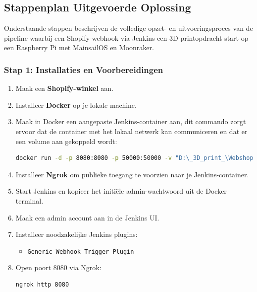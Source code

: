 \subsection{Stappenplan Uitgevoerde Oplossing}

Onderstaande stappen beschrijven de volledige opzet- en uitvoeringsproces van de pipeline waarbij een Shopify-webhook via Jenkins een 3D-printopdracht start op een Raspberry Pi met MainsailOS en Moonraker.

\subsubsection{Stap 1: Installaties en Voorbereidingen}
\begin{enumerate}
    \item Maak een \textbf{Shopify-winkel} aan.
    \item Installeer \textbf{Docker} op je lokale machine.
    \item Maak in Docker een aangepaste Jenkins-container aan, dit commando zorgt ervoor dat de container met het lokaal netwerk kan communiceren en dat er een volume aan gekoppeld  wordt:
    \begin{lstlisting}[language=bash, caption=Docker commando voor Jenkins met volume en poorten]
        docker run -d -p 8080:8080 -p 50000:50000 -v "D:\_3D_print_\Webshop:/var/jenkins_home" --name jenkins-met-backup jenkins-met-wijzigingen:custom
    \end{lstlisting}
    \item Installeer \textbf{Ngrok} om publieke toegang te voorzien naar je Jenkins-container.
    \item Start Jenkins en kopieer het initiële admin-wachtwoord uit de Docker terminal.
    \item Maak een admin account aan in de Jenkins UI.
    
    \item Installeer noodzakelijke Jenkins plugins:
    \begin{itemize}
        \item \texttt{Generic Webhook Trigger Plugin}
    \end{itemize}
    \item Open poort 8080 via Ngrok:
    \begin{lstlisting}[language=bash]
        ngrok http 8080
    \end{lstlisting}

\end{enumerate}

